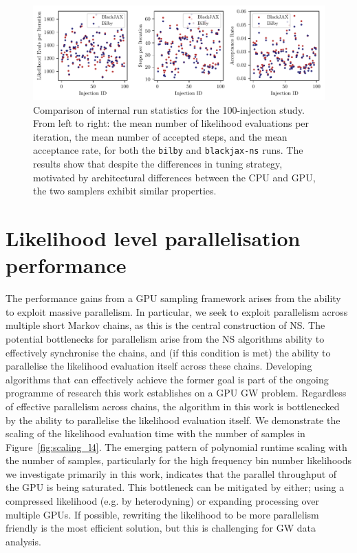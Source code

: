 \documentclass[fleqn,usenatbib]{mnras}
\begin{document}
\begin{figure}
    \centering
    \includegraphics{figures/performance_metrics.pdf}
    \caption{Comparison of internal run statistics for the 100-injection
    study. From left to right: the mean number of likelihood evaluations per iteration,
    the mean number of accepted steps, and the mean acceptance rate, for both the \texttt{bilby} and 
    \texttt{blackjax-ns} runs. The results show that despite the differences in tuning strategy,
    motivated by architectural differences between the CPU and GPU, the two samplers exhibit similar
    properties.}
    \label{fig:injection_study_stats}
\end{figure}

\section{Likelihood level parallelisation performance}
The performance gains from a GPU sampling framework arises from the ability to exploit massive parallelism. 
In particular, we seek to exploit parallelism across multiple short Markov chains, as this is the central 
construction of NS. The potential bottlenecks for parallelism arise from the NS algorithms ability to 
effectively synchronise the chains, and (if this condition is met) the ability to parallelise the likelihood 
evaluation itself across these chains. Developing algorithms that can effectively achieve the former goal 
is part of the ongoing programme of research this work establishes on a GPU GW problem. Regardless of 
effective parallelism across chains, the algorithm in this work is bottlenecked by the ability to 
parallelise the likelihood evaluation itself. We demonstrate the scaling of the likelihood evaluation 
time with the number of samples in Figure~\ref{fig:scaling_l4}. The emerging pattern of polynomial 
runtime scaling with the number of samples, particularly for the high frequency bin number likelihoods we investigate
primarily in this work, indicates that the parallel throughput of the GPU is being saturated. This 
bottleneck can be mitigated by either; using a compressed likelihood (e.g. by heterodyning) or expanding 
processing over multiple GPUs. If possible, rewriting the likelihood to be more parallelism friendly is 
the most efficient solution, but this is challenging for GW data analysis.
\end{document}
